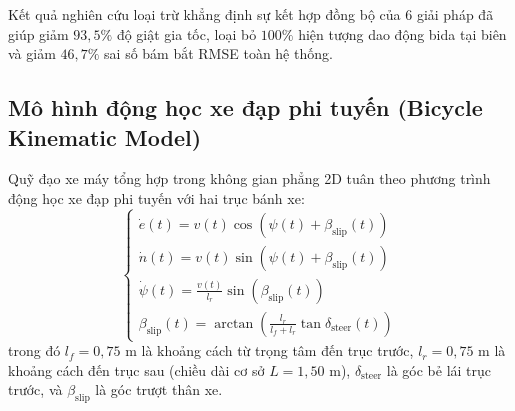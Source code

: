 \begin{table}[H]
\centering
\caption{Ma trận đánh giá nghiên cứu loại trừ 8 giai đoạn cải tiến tính chân thực quỹ đạo}
\label{tab:ablation-study-matrix}
\end{table}

Kết quả nghiên cứu loại trừ khẳng định sự kết hợp đồng bộ của 6 giải pháp đã giúp giảm $93{,}5\%$ độ giật gia tốc, loại bỏ $100\%$ hiện tượng dao động bida tại biên và giảm $46{,}7\%$ sai số bám bắt RMSE toàn hệ thống.

\subsection{Mô hình động học xe đạp phi tuyến (Bicycle Kinematic Model)}

\hspace{0.5cm} Quỹ đạo xe máy tổng hợp trong không gian phẳng 2D tuân theo phương trình động học xe đạp phi tuyến với hai trục bánh xe:
\begin{equation}
\begin{cases}
\dot{e}(t) = v(t) \cos(\psi(t) + \beta_{\text{slip}}(t)) \\
\dot{n}(t) = v(t) \sin(\psi(t) + \beta_{\text{slip}}(t)) \\
\dot{\psi}(t) = \frac{v(t)}{l_r} \sin(\beta_{\text{slip}}(t)) \\
\beta_{\text{slip}}(t) = \arctan\left( \frac{l_r}{l_f + l_r} \tan\delta_{\text{steer}}(t) \right)
\end{cases}
\label{eq:bicycle-kinematic-model}
\end{equation}
trong đó $l_f = 0{,}75$ m là khoảng cách từ trọng tâm đến trục trước, $l_r = 0{,}75$ m là khoảng cách đến trục sau (chiều dài cơ sở $L = 1{,}50$ m), $\delta_{\text{steer}}$ là góc bẻ lái trục trước, và $\beta_{\text{slip}}$ là góc trượt thân xe.

